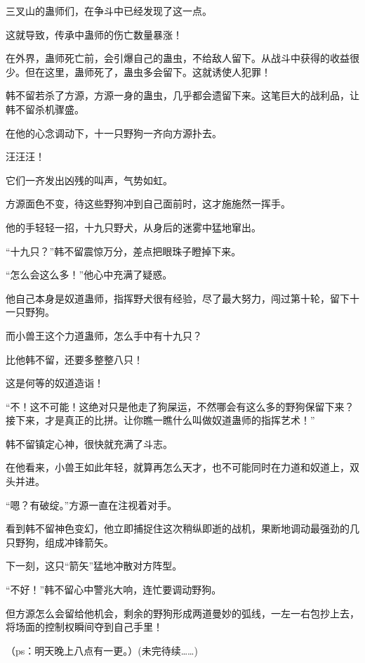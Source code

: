 \begin{this_body}
三叉山的蛊师们，在争斗中已经发现了这一点。

这就导致，传承中蛊师的伤亡数量暴涨！

在外界，蛊师死亡前，会引爆自己的蛊虫，不给敌人留下。从战斗中获得的收益很少。但在这里，蛊师死了，蛊虫多会留下。这就诱使人犯罪！

韩不留若杀了方源，方源一身的蛊虫，几乎都会遗留下来。这笔巨大的战利品，让韩不留杀机骤盛。

在他的心念调动下，十一只野狗一齐向方源扑去。

汪汪汪！

它们一齐发出凶残的叫声，气势如虹。

方源面色不变，待这些野狗冲到自己面前时，这才施施然一挥手。

他的手轻轻一招，十九只野犬，从身后的迷雾中猛地窜出。

“十九只？”韩不留震惊万分，差点把眼珠子瞪掉下来。

“怎么会这么多！”他心中充满了疑惑。

他自己本身是奴道蛊师，指挥野犬很有经验，尽了最大努力，闯过第十轮，留下十一只野狗。

而小兽王这个力道蛊师，怎么手中有十九只？

比他韩不留，还要多整整八只！

这是何等的奴道造诣！

“不！这不可能！这绝对只是他走了狗屎运，不然哪会有这么多的野狗保留下来？接下来，才是真正的比拼。让你瞧一瞧什么叫做奴道蛊师的指挥艺术！”

韩不留镇定心神，很快就充满了斗志。

在他看来，小兽王如此年轻，就算再怎么天才，也不可能同时在力道和奴道上，双头并进。

“嗯？有破绽。”方源一直在注视着对手。

看到韩不留神色变幻，他立即捕捉住这次稍纵即逝的战机，果断地调动最强劲的几只野狗，组成冲锋箭矢。

下一刻，这只“箭矢”猛地冲散对方阵型。

“不好！”韩不留心中警兆大响，连忙要调动野狗。

但方源怎么会留给他机会，剩余的野狗形成两道曼妙的弧线，一左一右包抄上去，将场面的控制权瞬间夺到自己手里！

（ps：明天晚上八点有一更。）(未完待续……)

\end{this_body}

